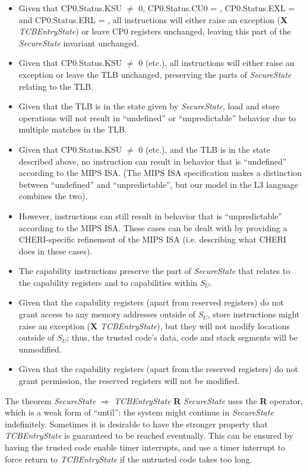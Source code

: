 \begin{itemize}
\item
Given that CP0.Status.KSU $\neq$ 0, CP0.Status.CU0 = \algorithmicfalse{},
CP0.Status.EXL = \algorithmicfalse{} and CP0.Status.ERL = \algorithmicfalse{},
all instructions will either raise an exception (\textbf{X}
\emph{TCBEntryState}) or leave CP0 registers unchanged, leaving this
part of the \emph{SecureState} invariant unchanged.
\item
Given that CP0.Status.KSU $\neq$ 0 (etc.), all instructions will
either raise an exception or leave the TLB unchanged, preserving the parts of
\emph{SecureState} relating to the TLB.
\item
Given that the TLB is in the state given by \emph{SecureState}, load and store
operations will not result in ``undefined'' or ``unpredictable'' behavior due
to multiple matches in the TLB.
\item
Given that CP0.Status.KSU $\neq$ 0 (etc.), and the TLB is in the state
described above, no instruction can result in
behavior that is ``undefined'' according to the MIPS ISA. (The MIPS ISA
specification makes a distinction between ``undefined'' and ``unpredictable'',
but our model in the L3 language combines the two).
\item
However, instructions can still result in behavior that is ``unpredictable''
according to the MIPS ISA. These cases can be dealt with by providing a
CHERI-specific refinement of the MIPS ISA (i.e. describing what CHERI does in
these cases).
\item
The capability instructions preserve the part of \emph{SecureState} that
relates to the capability registers and to capabilities within $S_U$.
\item
Given that the capability registers (apart from reserved registers) do not grant
access to any memory addresses outside of $S_U$, store instructions might raise
an exception (\textbf{X} \emph{TCBEntryState}), but they will not modify locations
outside of $S_U$; thus, the trusted code's data, code and stack segments
 will be unmodified.
\item
Given that the capability registers (apart from the reserved registers) do
not grant \cappermASR* permission, the reserved
registers will not be modified.
\end{itemize}

The theorem \emph{SecureState} $\Rightarrow$ \emph{TCBEntryState} \textbf{R}
\emph{SecureState} uses the \textbf{R} operator, which is a weak form of
``until'': the system might continue in \emph{SecureState} indefinitely.
Sometimes it is desirable to have the stronger property that
\emph{TCBEntryState} is guaranteed to be reached eventually. This can be
ensured by having the trusted code enable timer interrupts, and use a
timer interrupt to force return to \emph{TCBEntryState} if the untrusted
code takes too long.


